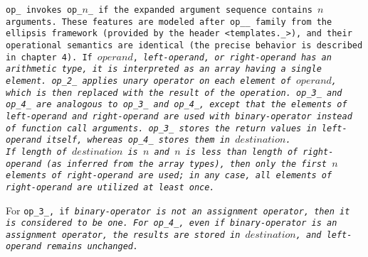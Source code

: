 \tt{op_} invokes \tt{op_}$n$\_ if the
expanded argument sequence contains $n$ arguments.
These features are modeled after  \tt{op__} family from the ellipsis
framework (provided by the header \tt{<templates._>}), and their operational
semantics are identical (the precise behavior is described in chapter 4).
If $operand$, \it{left-operand}, or \it{right-operand} has an
arithmetic type, it is interpreted as an array having a single element.
\tt{op_2_} applies unary operator on each element of $operand$,
which is then replaced with the result of the operation.
\tt{op_3_} and \tt{op_4_} are analogous to \tt{op_3_} and \tt{op_4_},
except that the elements of \it{left-operand} and \it{right-operand}
are used with \it{binary-operator} instead of function call arguments.
\tt{op_3_} stores the return values in \it{left-operand} itself,
whereas \tt{op_4_} stores them in $destination$.\\
If length of $destination$ is $n$ and $n$ is less than length of
\it{right-operand} (as inferred from the array types), then only
the first $n$ elements of \it{right-operand} are used; in any case,
all elements of \it{right-operand} are utilized at least once.

For \tt{op_3_}, if \it{binary-operator} is not an assignment operator,
then it is considered to be one. For \tt{op_4_}, even if
\it{binary-operator} is an assignment operator, the results are
stored in $destination$, and \it{left-operand} remains unchanged.
